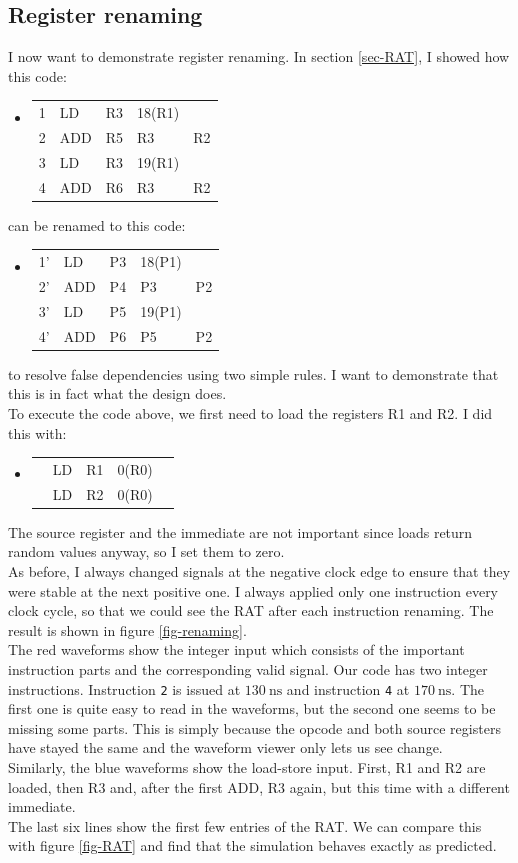 \documentclass[12pt,a4paper]{article} %
\newenvironment {assembly}{\begingroup \ttfamily \color{Gray} \begin{itemize} \item[]}{\end{itemize}\endgroup}
\begin{document}
\subsection{Register renaming}
I now want to demonstrate register renaming. In section \ref{sec-RAT}, I showed how this code:
\begin{assembly}
	\begin{tabularx} {\textwidth} {n o a a X}
		1 & LD  & R3 & 18(R1)	& \\
		2 & ADD & R5 & R3		& R2\\
		3 & LD  & R3 & 19(R1)	& \\
		4 & ADD & R6 & R3		& R2
	\end{tabularx}%
\end{assembly}%
can be renamed to this code:
\begin{assembly}
	\begin{tabularx} {\textwidth} {n o a a X}
		1' & LD & P3 & 18(P1)	& \\
		2' & ADD & P4 & P3		& P2\\
		3' & LD & P5 & 19(P1)	& \\
		4' & ADD & P6 & P5		& P2
	\end{tabularx}%
\end{assembly}%
to resolve false dependencies using two simple rules. I want to demonstrate that this is in fact what the design does.\\
To execute the code above, we first need to load the registers R1 and R2. I did this with:
\begin{assembly}
	\begin{tabularx} {\textwidth} {n o a a X}
		& LD & R1 & 0(R0) &\\
		& LD & R2 & 0(R0) &\\
	\end{tabularx}
\end{assembly}
The source register and the immediate are not important since loads return random values anyway, so I set them to zero.\\ 
As before, I always changed signals at the negative clock edge to ensure that they were stable at the next positive one. I always applied only one instruction every clock cycle, so that we could see the RAT after each instruction renaming. The result is shown in figure \ref{fig-renaming}.\\
The red waveforms show the integer input which consists of the important instruction parts and the corresponding valid signal. Our code has two integer instructions. Instruction \texttt{2} is issued at $\SI{130}{\ns}$ and instruction \texttt{4} at $\SI{170}{\ns}$. The first one is quite easy to read in the waveforms, but the second one seems to be missing some parts. This is simply because the opcode and both source registers have stayed the same and the waveform viewer only lets us see change. \\
Similarly, the blue waveforms show the load-store input. First, R1 and R2 are loaded, then R3 and, after the first ADD, R3 again, but this time with a different immediate.\\
The last six lines show the first few entries of the RAT. We can compare this with figure \ref{fig-RAT} and find that the simulation behaves exactly as predicted. 
\end{document}
